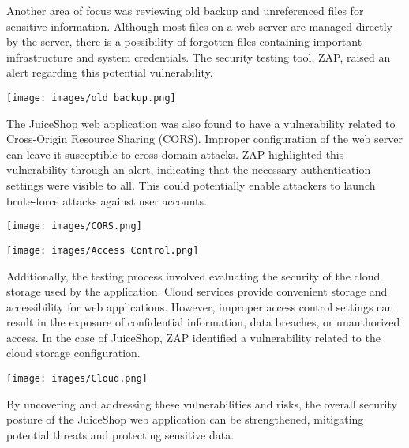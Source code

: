\documentclass[12pt]{article}
\begin{document}
Another area of focus was reviewing old backup and unreferenced files for sensitive information. Although most files on a web server are managed directly by the server, there is a possibility of forgotten files containing important infrastructure and system credentials. The security testing tool, ZAP, raised an alert regarding this potential vulnerability.\\

\begin{center}
    \texttt{[image: images/old backup.png]}
\end{center}


The JuiceShop web application was also found to have a vulnerability related to Cross-Origin Resource Sharing (CORS). Improper configuration of the web server can leave it susceptible to cross-domain attacks. ZAP highlighted this vulnerability through an alert, indicating that the necessary authentication settings were visible to all. This could potentially enable attackers to launch brute-force attacks against user accounts.\\

\newpage

\begin{center}
    \texttt{[image: images/CORS.png]}
\end{center}

\begin{center}
    \texttt{[image: images/Access Control.png]}
\end{center}


Additionally, the testing process involved evaluating the security of the cloud storage used by the application. Cloud services provide convenient storage and accessibility for web applications. However, improper access control settings can result in the exposure of confidential information, data breaches, or unauthorized access. In the case of JuiceShop, ZAP identified a vulnerability related to the cloud storage configuration.\\

\begin{center}
    \texttt{[image: images/Cloud.png]}
\end{center}


By uncovering and addressing these vulnerabilities and risks, the overall security posture of the JuiceShop web application can be strengthened, mitigating potential threats and protecting sensitive data.\\
\end{document}
